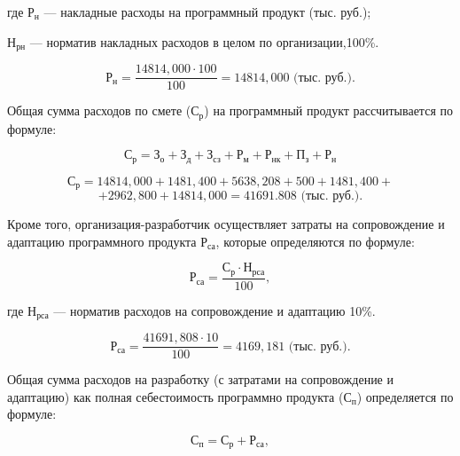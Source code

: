 где \(\text{Р}_{\text{н}}\) --- накладные расходы на программный продукт (тыс. руб.);

\(\text{Н}_{\text{рн}}\) --- норматив накладных расходов в целом по организации,100\%.

\begin{displaymath}
  \text{Р}_{\text{н}} = \frac{14814,000 \cdot 100}{100} = 14814,000 \text{ (тыс. руб.)}.
\end{displaymath}

Общая сумма расходов по смете (\(\text{С}_{\text{р}}\)) на программный продукт рассчитывается по формуле:

\begin{displaymath}
  \text{С}_{\text{р}} = \text{З}_{\text{о}} + \text{З}_{\text{д}} + \text{З}_{\text{сз}} + \text{Р}_{\text{м}} + \text{Р}_{\text{нк}} + \text{П}_{\text{з}} + \text{Р}_{\text{н}}
\end{displaymath}

\begin{displaymath}
  \text{С}_{\text{р}} = 14814,000+1481,400+5638,208+500+1481,400+
\end{displaymath}
\begin{displaymath}
  +2962,800+14814,000=41691.808 \text{ (тыс. руб.)}.
\end{displaymath}


Кроме того, организация-разработчик осуществляет затраты на сопровождение и адаптацию программного продукта \(\text{Р}_{\text{са}}\), которые определяются по формуле:

\begin{displaymath}
  \text{Р}_{\text{са}} = \frac{\text{С}_{\text{р}} \cdot \text{Н}_{\text{рса}}}{100},
\end{displaymath}

где \(\text{Н}_{\text{рса}}\) --- норматив расходов на сопровождение и адаптацию 10\%.

\begin{displaymath}
  \text{Р}_{\text{са}} = \frac{41691,808 \cdot 10}{100} = 4169,181 \text{ (тыс. руб.)}.
\end{displaymath}

Общая сумма расходов на разработку (с затратами на сопровождение и адаптацию) как полная себестоимость программно продукта (\(\text{С}_{\text{п}}\)) определяется по формуле:

\begin{displaymath}
  \text{С}_{\text{п}} = \text{С}_{\text{р}} + \text{Р}_{\text{са}},
\end{displaymath}


